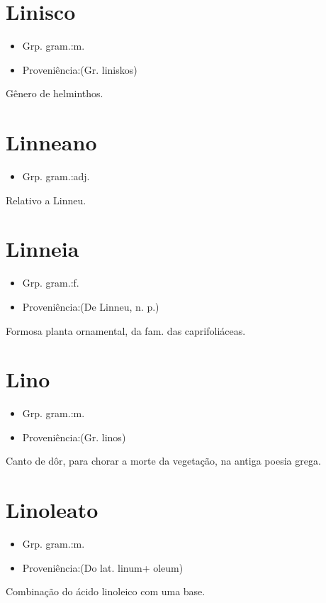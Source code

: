 \section{Linisco}
\begin{itemize}
\item {Grp. gram.:m.}
\end{itemize}
\begin{itemize}
\item {Proveniência:(Gr. \textunderscore liniskos\textunderscore )}
\end{itemize}
Gênero de helminthos.
\section{Linneano}
\begin{itemize}
\item {Grp. gram.:adj.}
\end{itemize}
Relativo a Linneu.
\section{Linneia}
\begin{itemize}
\item {Grp. gram.:f.}
\end{itemize}
\begin{itemize}
\item {Proveniência:(De \textunderscore Linneu\textunderscore , n. p.)}
\end{itemize}
Formosa planta ornamental, da fam. das caprifoliáceas.
\section{Lino}
\begin{itemize}
\item {Grp. gram.:m.}
\end{itemize}
\begin{itemize}
\item {Proveniência:(Gr. \textunderscore linos\textunderscore )}
\end{itemize}
Canto de dôr, para chorar a morte da vegetação, na antiga poesia grega.
\section{Linoleato}
\begin{itemize}
\item {Grp. gram.:m.}
\end{itemize}
\begin{itemize}
\item {Proveniência:(Do lat. \textunderscore linum\textunderscore  + \textunderscore oleum\textunderscore )}
\end{itemize}
Combinação do ácido linoleico com uma base.
